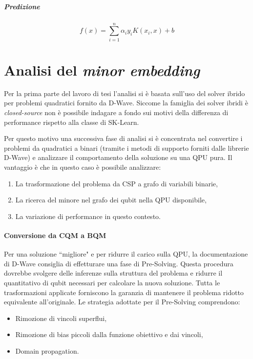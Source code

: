 \documentclass[12pt]{article}
\begin{document}
\subparagraph{Predizione}

$$f(x)=\sum_{i=1}^n\alpha_iy_iK(x_i, x) + b$$

\section{Analisi del \emph{minor embedding}}

Per la prima parte del lavoro di tesi l'analisi si è basata sull'uso del solver ibrido per problemi quadratici fornito da D-Wave.
Siccome la famiglia dei solver ibridi è \emph{closed-source} non è possibile indagare a fondo sui motivi della differenza di performance rispetto alla classe di SK-Learn.

Per questo motivo una successiva fase di analisi si è concentrata nel convertire i problemi da quadratici a binari (tramite i metodi di supporto forniti dalle librerie D-Wave) e analizzare il comportamento della soluzione su una QPU pura.
Il vantaggio è che in questo caso è possibile analizzare:
\begin{enumerate}
  \item La trasformazione del problema da CSP a grafo di variabili binarie,
  \item La ricerca del minore nel grafo dei qubit nella QPU disponibile,
  \item La variazione di performance in questo contesto.
\end{enumerate}

\paragraph{Conversione da CQM a BQM}

Per una soluzione “migliore" e per ridurre il carico sulla QPU, la documentazione di D-Wave consiglia di effetturare una fase di Pre-Solving.
Questa procedura dovrebbe svolgere delle inferenze sulla struttura del problema e ridurre il quantitativo di qubit necessari per calcolare la nuova soluzione.
Tutta le trasformazioni applicate forniscono la garanzia di mantenere il problema ridotto equivalente all'originale.
Le strategia adottate per il Pre-Solving comprendono:
\begin{itemize}
  \item Rimozione di vincoli superflui,
  \item Rimozione di bias piccoli dalla funzione obiettivo e dai vincoli,
  \item Domain propagation.
\end{itemize}
\end{document}
